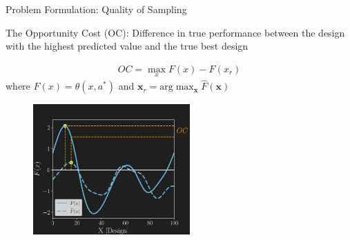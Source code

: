 \documentclass{beamer}
\begin{document}
\begin{frame}{Problem Formulation: Quality of Sampling}

The Opportunity Cost (OC): Difference in true performance between the design with the highest predicted value and the true best design

\begin{align*}
OC = \max_{x}F(x)-F(x_{r})
\end{align*}
where $F(x) = \theta(x,a^{*})$ and $\mathbf{x}_{r} = \textrm{arg}\max_{\mathbf{x}}\hat{F}(\mathbf{x})$

\begin{figure}
	\begin{center}
		\includegraphics[width=6cm]{PROB_2.pdf}
	\end{center}
\end{figure}

\end{frame}
\end{document}
